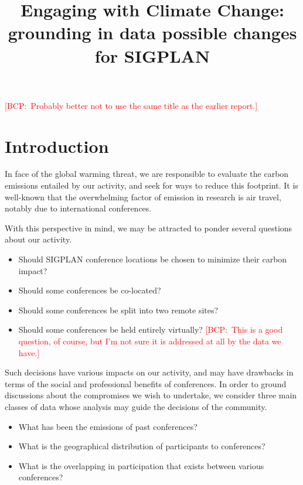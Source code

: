 \documentclass{scrartcl}
\title{Engaging with Climate Change: grounding in data possible changes for SIGPLAN}
\newcommand{\yz}[1]{\textcolor{blue}{{[YZ:~#1]}}}
\newcommand{\bcp}[1]{\textcolor{red}{{[BCP:~#1]}}}
\newcommand{\yz}[1]{}
\newcommand{\bcp}[1]{}
\begin{document}
\maketitle

\bcp{Probably better not to use the same title as the earlier report.}

\section{Introduction}

In face of the global warming threat, we are responsible to evaluate the carbon
emissions entailed by our activity, and seek for ways to reduce this footprint.
It is well-known that the overwhelming factor of emission in research is air travel,
notably due to international conferences.

With this perspective in mind, we may be attracted to ponder several questions
about our activity.
\begin{itemize}
\item Should SIGPLAN conference locations be chosen to minimize their
carbon impact?  
\item Should some conferences be co-located?
\item Should some conferences be split into two remote sites?
\item Should some conferences be held entirely virtually?  \bcp{This is a
  good question, of course, but I'm not sure it is addressed at all by the
  data we have.}
\end{itemize}

Such decisions have various impacts on our activity, and may have drawbacks in
terms of the social and professional benefits of conferences. 
In order to ground discussions about the compromises we wish to undertake, we consider
three main classes of data whose analysis may guide the decisions of the community.
\begin{itemize}
\item What has been the emissions of past conferences?
\item What is the geographical distribution of participants to conferences?
\item What is the overlapping in participation that exists between various conferences?
\end{itemize}
\end{document}
